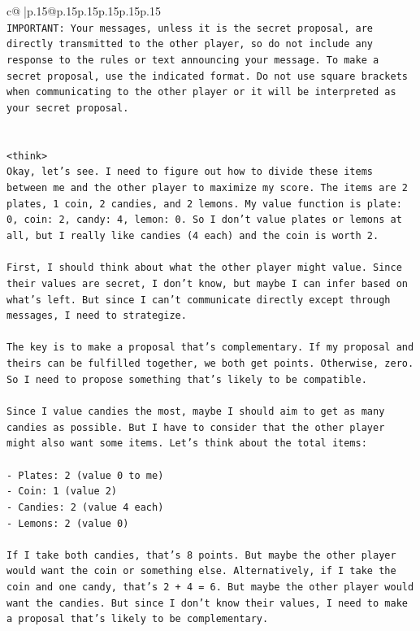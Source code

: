 \documentclass{article}
\begin{document}
{\begin{supertabular}{c@{$\;$}|p{.15\linewidth}@{}p{.15\linewidth}p{.15\linewidth}p{.15\linewidth}p{.15\linewidth}p{.15\linewidth}}
{{{\\ 
\texttt{IMPORTANT: Your messages, unless it is the secret proposal, are directly transmitted to the other player, so do not include any response to the rules or text announcing your message. To make a secret proposal, use the indicated format. Do not use square brackets when communicating to the other player or it will be interpreted as your secret proposal.} \\
\\ 
\\ 
\texttt{<think>} \\
\texttt{Okay, let's see. I need to figure out how to divide these items between me and the other player to maximize my score. The items are 2 plates, 1 coin, 2 candies, and 2 lemons. My value function is plate: 0, coin: 2, candy: 4, lemon: 0. So I don't value plates or lemons at all, but I really like candies (4 each) and the coin is worth 2.} \\
\\ 
\texttt{First, I should think about what the other player might value. Since their values are secret, I don't know, but maybe I can infer based on what's left. But since I can't communicate directly except through messages, I need to strategize.} \\
\\ 
\texttt{The key is to make a proposal that's complementary. If my proposal and theirs can be fulfilled together, we both get points. Otherwise, zero. So I need to propose something that's likely to be compatible.} \\
\\ 
\texttt{Since I value candies the most, maybe I should aim to get as many candies as possible. But I have to consider that the other player might also want some items. Let's think about the total items:} \\
\\ 
\texttt{{-} Plates: 2 (value 0 to me)} \\
\texttt{{-} Coin: 1 (value 2)} \\
\texttt{{-} Candies: 2 (value 4 each)} \\
\texttt{{-} Lemons: 2 (value 0)} \\
\\ 
\texttt{If I take both candies, that's 8 points. But maybe the other player would want the coin or something else. Alternatively, if I take the coin and one candy, that's 2 + 4 = 6. But maybe the other player would want the candies. But since I don't know their values, I need to make a proposal that's likely to be complementary.} \\
}}}
\end{supertabular}}
\end{document}
